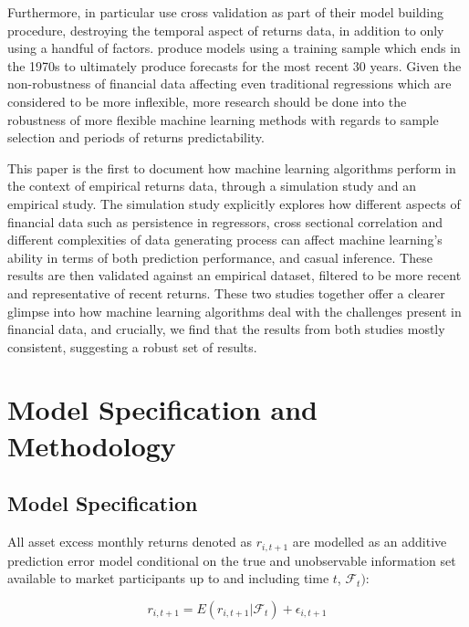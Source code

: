 \documentclass[11pt, a4paper, table]{article}
\begin{document}
Furthermore, \cite{feng_deep_2018} in particular use cross validation as part of their model building procedure, destroying the temporal aspect of returns data, in addition to only using a handful of factors. \cite{gu_empirical_2018} produce models using a training sample which ends in the 1970s to ultimately produce forecasts for the most recent 30 years. Given the non-robustness of financial data affecting even traditional regressions which are considered to be more inflexible, more research should be done into the robustness of more flexible machine learning methods with regards to sample selection and periods of returns predictability.

This paper is the first to document how machine learning algorithms perform in the context of empirical returns data, through a simulation study and an empirical study. The simulation study explicitly explores how different aspects of financial data such as persistence in regressors, cross sectional correlation and different complexities of data generating process can affect machine learning's ability in terms of both prediction performance, and casual inference. These results are then validated against an empirical dataset, filtered to be more recent and representative of recent returns. These two studies together offer a clearer glimpse into how machine learning algorithms deal with the challenges present in financial data, and crucially, we find that the results from both studies mostly consistent, suggesting a robust set of  results.


\section{Model Specification and Methodology}

\subsection{Model Specification}

All asset excess monthly returns denoted as $r_{i, t+1}$ are modelled as an additive prediction error model conditional on the true and unobservable information set available to market participants up to and including time $t$, $\mathcal{F}_t)$:

\begin{equation}
	r_{i, t+1} = E(r_{i, t+1} | \mathcal{F}_t) + \epsilon_{i, t+1}
\end{equation}
\end{document}
